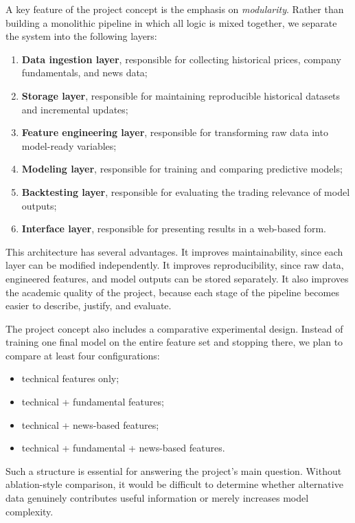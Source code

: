 \documentclass[12pt,a4paper]{article}
\begin{document}
A key feature of the project concept is the emphasis on \textit{modularity}. Rather than building a monolithic pipeline in which all logic is mixed together, we separate the system into the following layers:

\begin{enumerate}[leftmargin=1.2cm]
    \item \textbf{Data ingestion layer}, responsible for collecting historical prices, company fundamentals, and news data;
    \item \textbf{Storage layer}, responsible for maintaining reproducible historical datasets and incremental updates;
    \item \textbf{Feature engineering layer}, responsible for transforming raw data into model-ready variables;
    \item \textbf{Modeling layer}, responsible for training and comparing predictive models;
    \item \textbf{Backtesting layer}, responsible for evaluating the trading relevance of model outputs;
    \item \textbf{Interface layer}, responsible for presenting results in a web-based form.
\end{enumerate}

This architecture has several advantages. It improves maintainability, since each layer can be modified independently. It improves reproducibility, since raw data, engineered features, and model outputs can be stored separately. It also improves the academic quality of the project, because each stage of the pipeline becomes easier to describe, justify, and evaluate.

The project concept also includes a comparative experimental design. Instead of training one final model on the entire feature set and stopping there, we plan to compare at least four configurations:

\begin{itemize}[leftmargin=1.2cm]
    \item technical features only;
    \item technical + fundamental features;
    \item technical + news-based features;
    \item technical + fundamental + news-based features.
\end{itemize}

Such a structure is essential for answering the project's main question. Without ablation-style comparison, it would be difficult to determine whether alternative data genuinely contributes useful information or merely increases model complexity.
\end{document}
